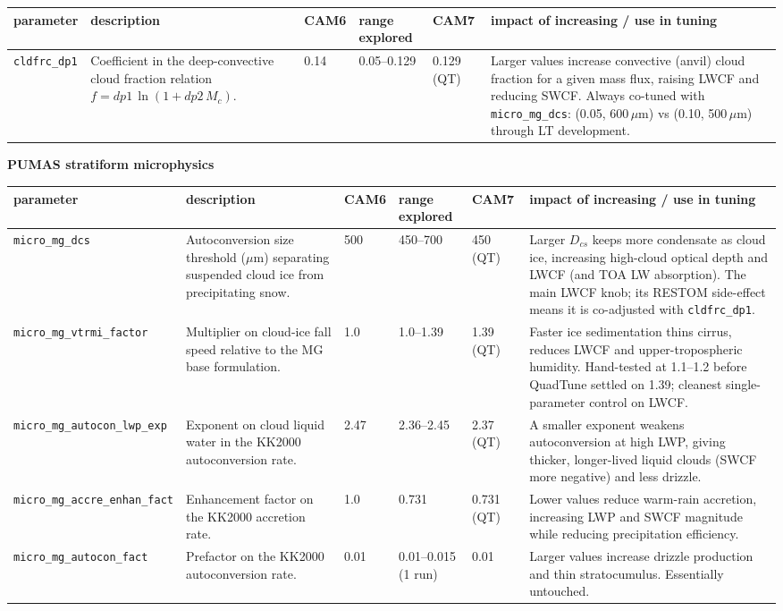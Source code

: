 \documentclass[draft]{agujournal2019}
\begin{document}
\scriptsize
 \begin{tabular}{p{2.3cm} p{3.1cm} p{0.9cm} p{1.8cm} p{1.0cm} p{4.2cm}}
  \hline
 parameter & description & CAM6 & range explored & CAM7 & impact of increasing / use in tuning \\
 \hline  \hline
\texttt{cldfrc\_\allowbreak dp1} &
Coefficient in the deep-convective cloud fraction relation
$f = dp1\,\ln(1 + dp2\,M_c)$. &
0.14 & 0.05--0.129 & 0.129 (QT) &
Larger values increase convective (anvil) cloud fraction for a given mass
flux, raising LWCF and reducing SWCF. Always co-tuned with
\texttt{micro\_mg\_dcs}: (0.05, 600\,$\mu$m) vs (0.10, 500\,$\mu$m) through LT
development. \\
 \hline
 \hline
 \end{tabular}
\normalsize


\newpage
\noindent\textbf{PUMAS stratiform microphysics}
\medskip

\scriptsize
 \begin{tabular}{p{2.3cm} p{3.1cm} p{0.9cm} p{1.8cm} p{1.0cm} p{4.2cm}}
  \hline
 parameter & description & CAM6 & range explored & CAM7 & impact of increasing / use in tuning \\
 \hline  \hline
\texttt{micro\_\allowbreak mg\_\allowbreak dcs} &
Autoconversion size threshold ($\mu$m) separating suspended cloud ice from
precipitating snow. &
500 & 450--700 & 450 (QT) &
Larger $D_{cs}$ keeps more condensate as cloud ice, increasing high-cloud
optical depth and LWCF (and TOA LW absorption). The main LWCF knob; its
RESTOM side-effect means it is co-adjusted with \texttt{cldfrc\_dp1}. \\

\texttt{micro\_\allowbreak mg\_\allowbreak vtrmi\_\allowbreak factor} &
Multiplier on cloud-ice fall speed relative to the MG base formulation. &
1.0 & 1.0--1.39 & 1.39 (QT) &
Faster ice sedimentation thins cirrus, reduces LWCF and upper-tropospheric
humidity. Hand-tested at 1.1--1.2 before QuadTune settled on 1.39; cleanest
single-parameter control on LWCF. \\

\texttt{micro\_\allowbreak mg\_\allowbreak autocon\_\allowbreak lwp\_\allowbreak exp} &
Exponent on cloud liquid water in the KK2000 autoconversion rate. &
2.47 & 2.36--2.45 & 2.37 (QT) &
A smaller exponent weakens autoconversion at high LWP, giving thicker,
longer-lived liquid clouds (SWCF more negative) and less drizzle. \\

\texttt{micro\_\allowbreak mg\_\allowbreak accre\_\allowbreak enhan\_\allowbreak fact} &
Enhancement factor on the KK2000 accretion rate. &
1.0 & 0.731 & 0.731 (QT) &
Lower values reduce warm-rain accretion, increasing LWP and SWCF magnitude
while reducing precipitation efficiency. \\

\texttt{micro\_\allowbreak mg\_\allowbreak autocon\_\allowbreak fact} &
Prefactor on the KK2000 autoconversion rate. &
0.01 & 0.01--0.015 (1 run) & 0.01 &
Larger values increase drizzle production and thin stratocumulus. Essentially
untouched. \\
 \hline
 \hline
 \end{tabular}
\normalsize
\end{document}
